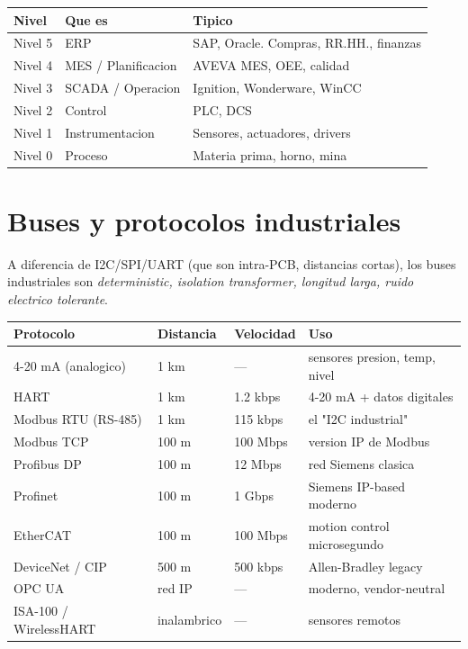 \documentclass[11pt,a4paper,oneside]{report}
\begin{document}
\begin{center}
\begin{tabular}{lll}
\toprule
\textbf{Nivel} & \textbf{Que es} & \textbf{Tipico} \\
\midrule
Nivel 5 & ERP                   & SAP, Oracle. Compras, RR.HH., finanzas \\
Nivel 4 & MES / Planificacion    & AVEVA MES, OEE, calidad \\
Nivel 3 & SCADA / Operacion      & Ignition, Wonderware, WinCC \\
Nivel 2 & Control                & PLC, DCS \\
Nivel 1 & Instrumentacion        & Sensores, actuadores, drivers \\
Nivel 0 & Proceso                & Materia prima, horno, mina \\
\bottomrule
\end{tabular}
\end{center}

\chapter{Buses y protocolos industriales}

A diferencia de I2C/SPI/UART (que son intra-PCB, distancias cortas), los
buses industriales son \emph{deterministic, isolation transformer, longitud
larga, ruido electrico tolerante}.

\begin{center}
\begin{tabular}{llll}
\toprule
\textbf{Protocolo} & \textbf{Distancia} & \textbf{Velocidad} & \textbf{Uso} \\
\midrule
4-20 mA (analogico) & 1 km     & ---       & sensores presion, temp, nivel \\
HART                & 1 km     & 1.2 kbps  & 4-20 mA + datos digitales \\
Modbus RTU (RS-485) & 1 km     & 115 kbps  & el "I2C industrial" \\
Modbus TCP          & 100 m    & 100 Mbps  & version IP de Modbus \\
Profibus DP         & 100 m    & 12 Mbps   & red Siemens clasica \\
Profinet            & 100 m    & 1 Gbps    & Siemens IP-based moderno \\
EtherCAT            & 100 m    & 100 Mbps  & motion control microsegundo \\
DeviceNet / CIP     & 500 m    & 500 kbps  & Allen-Bradley legacy \\
OPC UA              & red IP   & ---       & moderno, vendor-neutral \\
ISA-100 / WirelessHART & inalambrico & --- & sensores remotos \\
\bottomrule
\end{tabular}
\end{center}
\end{document}
